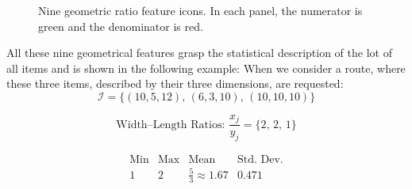 \begin{figure}
    \centering

    \vspace{25pt}
    \vspace{25pt}
    \caption[Nine geometric ratio feature icons.]{Nine geometric ratio feature icons. In each panel, the \textcolor{numC}{numerator is green}
        and the \textcolor{denC}{denominator is red}.}
\end{figure}

All these nine geometrical features grasp the statistical description of the lot of all items and is shown in the following example:
When we consider a route, where these three items, described by their three dimensions, are requested:
\[
    \mathcal{I} = \{(10,5,12),\,(6,3,10),\,(10,10,10)\}
\]

\[
    \text{Width--Length Ratios: }
    \frac{x_j}{y_j} = \{2,\,2,\,1\}
\]

\[
    \begin{array}{c|c|c|c}
        \text{Min} & \text{Max} & \text{Mean}               & \text{Std. Dev.} \\
        \hline
        1          & 2          & \tfrac{5}{3} \approx 1.67 & 0.471            \\
    \end{array}
\]

